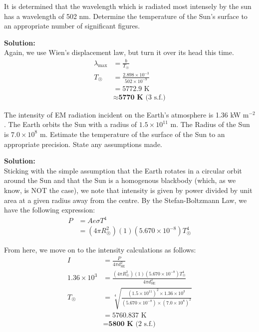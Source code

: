 \documentclass[a4paper, 12pt, addpoints]{exam}
\begin{document}
\begin{questions}
\question It is determined that the wavelength which is radiated most intensely by the sun has a wavelength of 502 nm. Determine the temperature of the Sun's surface to an appropriate number of significant figures.
\begin{tcolorbox}
\textbf{Solution:} \\
Again, we use Wien's displacement law, but turn it over its head this time.
\begin{align*}
\lambda_\text{max} &= \frac{b}{T_{\astrosun}} \\
T_{\astrosun} &= \frac{2.898 \times 10^{-3}}{502 \times 10^{-9}} \\
&= 5772.9\text{ K} \\
&\approx \textbf{5770 K}\text{ (3 s.f.)}
\end{align*}
\end{tcolorbox}
\newpage
\question The intensity of EM radiation incident on the Earth's atmosphere is 1.36 kW m${}^{-2}$. The Earth orbits the Sun with a radius of $1.5 \times 10^{11}$ m. The Radius of the Sun is $7.0 \times 10^8$ m. Estimate the temperature of the surface of the Sun to an appropriate precision. State any assumptions made.
\begin{tcolorbox}
\textbf{Solution:} \\
Sticking with the simple assumption that the Earth rotates in a circular orbit around the Sun and that the Sun is a homogenous blackbody (which, as we know, is NOT the case), we note that intensity is given by power divided by unit area at a given radius away from the centre. By the Stefan-Boltzmann Law, we have the following expression:
\begin{align*}
P &= Ae\sigma T^4 \\
&= (4\pi R_{\astrosun} ^2)(1)(5.670 \times 10^{-8})T_{\astrosun}^4
\end{align*}

From here, we move on to the intensity calculations as follows:
\begin{align*}
I &= \frac{P}{4\pi d_\text{SE}^2} \\
1.36\times 10^3 &= \frac{(4\pi R_{\astrosun} ^2)(1)(5.670 \times 10^{-8})T_{\astrosun}^4}{4\pi d_\text{SE}^2} \\
T_{\astrosun} &= \sqrt[4]{\frac{(1.5\times 10^{11})^2 \times 1.36 \times 10^3}{(5.670\times10^{-8})\times(7.0\times 10^8)^2}} \\
&= 5760.837\text{ K} \\
&= \textbf{5800 K}\text{ (2 s.f.)}
\end{align*}

\end{tcolorbox}
\end{questions}
\newpage
\end{document}
